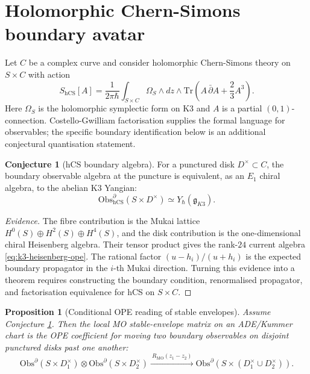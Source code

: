 \documentclass[11pt]{article}
\newtheorem{proposition}[theorem]{Proposition}
\theoremstyle{definition}
\newtheorem{conjecture}[theorem]{Conjecture}
\renewcommand{\gg}{\mathfrak{g}}
\newcommand{\YgK}{Y_\hbar(\gg_{K3})}
\newcommand{\Obs}{\mathrm{Obs}}
\newcommand{\Tr}{\mathrm{Tr}}
\begin{document}
\section{Holomorphic Chern-Simons boundary avatar}
\label{sec:hcs}

Let $C$ be a complex curve and consider holomorphic Chern-Simons theory
on $S\times C$ with action
\begin{equation}
\label{eq:hcs-action}
  S_{\mathrm{hCS}}[A]
  =
  \frac{1}{2\pi\hbar}
  \int_{S\times C}
  \Omega_S\wedge dz\wedge
  \Tr\!\left(A\,\bar\partial A+\frac{2}{3}A^3\right).
\end{equation}
Here $\Omega_S$ is the holomorphic symplectic form on K3 and $A$ is a
partial $(0,1)$-connection. Costello-Gwilliam factorisation supplies the
formal language for observables; the specific boundary identification
below is an additional conjectural quantisation statement.

\begin{conjecture}[hCS boundary algebra]
\label{conj:k3-yangian-as-boundary}
For a punctured disk $D^\times\subset C$, the boundary observable algebra
at the puncture is equivalent, as an $E_1$ chiral algebra, to the
abelian K3 Yangian:
\[
  \Obs_{\mathrm{hCS}}^\partial(S\times D^\times)
  \simeq
  \YgK.
\]
\end{conjecture}

\begin{proof}[Evidence]
The fibre contribution is the Mukai lattice
$H^0(S)\oplus H^2(S)\oplus H^4(S)$, and the disk contribution is the
one-dimensional chiral Heisenberg algebra. Their tensor product gives
the rank-$24$ current algebra \eqref{eq:k3-heisenberg-ope}. The rational
factor $(u-h_i)/(u+h_i)$ is the expected boundary propagator in the
$i$-th Mukai direction. Turning this evidence into a theorem requires
constructing the boundary condition, renormalised propagator, and
factorisation equivalence for hCS on $S\times C$.
\end{proof}

\begin{proposition}[Conditional OPE reading of stable envelopes]
\label{prop:mo-as-ope}
Assume Conjecture \ref{conj:k3-yangian-as-boundary}. Then the local
MO stable-envelope matrix on an ADE/Kummer chart is the OPE coefficient
for moving two boundary observables on disjoint punctured disks past one
another:
\[
  \Obs^\partial(S\times D_1^\times)\otimes
  \Obs^\partial(S\times D_2^\times)
  \xrightarrow{\ R_{\mathrm{MO}}(z_1-z_2)\ }
  \Obs^\partial(S\times(D_1^\times\cup D_2^\times)).
\]
\end{proposition}
\end{document}
